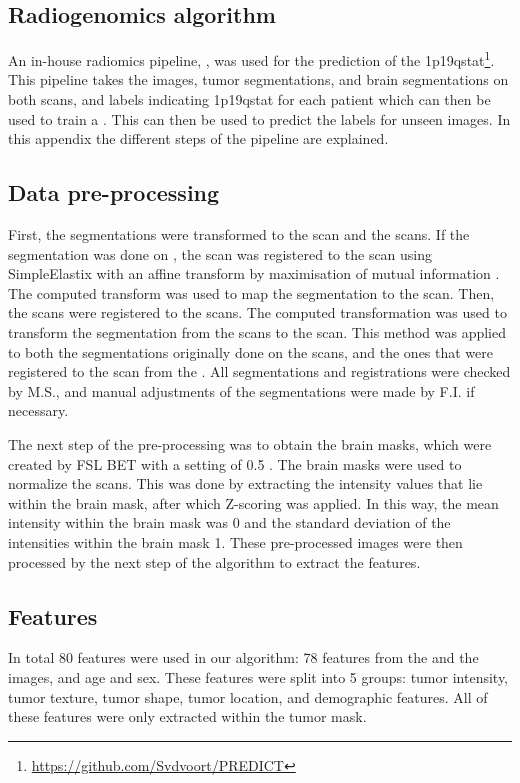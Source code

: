 \begin{subappendices}
\section{Radiogenomics algorithm}\label{app:LGG_1p19q_algorithm}
An in-house radiomics pipeline, , was used for the prediction of the \acl{1p19qstat}\footnote{\url{https://github.com/Svdvoort/PREDICT}}.
This pipeline takes the    images, \gls{tumor} segmentations, and brain segmentations on both scans, and labels indicating \acl{1p19qstat} for each patient which can then be used to train a  \autocite{cortes1995support}.
This  can then be used to predict the labels for unseen images. In this appendix the different steps of the pipeline are explained.

\subsection{Data pre-processing}
First, the segmentations were transformed to the  scan and the  scans.
If the segmentation was done on , the  scan was registered to the  scan using SimpleElastix with an affine transform by maximisation of mutual information \autocite{marstal2016simpleelastix}.
The computed transform was used to map the  segmentation to the  scan.
Then, the  scans were registered to the  scans.
The computed transformation was used to transform the segmentation from the  scans to the  scan.
This method was applied to both the segmentations originally done on the  scans, and the ones that were registered to the  scan from the .
All segmentations and registrations were checked by M.S., and manual adjustments of the segmentations were made by F.I. if necessary.

The next step of the pre-processing was to obtain the brain masks, which were created by FSL BET with a setting of 0.5 \autocite{smith2002fast}.
The brain masks were used to normalize the scans.
This was done by extracting the intensity values that lie within the brain mask, after which Z-scoring was applied.
In this way, the mean intensity within the brain mask was 0 and the standard deviation of the intensities within the brain mask 1.
These pre-processed images were then processed by the next step of the algorithm to extract the features.

\subsection{Features}
In total 80 features were used in our algorithm: 78 features from the  and the  images, and age and sex.
These features were split into 5 groups: \gls{tumor} intensity, \gls{tumor} texture, \gls{tumor} shape, \gls{tumor} location, and demographic features.
All of these features were only extracted within the \gls{tumor} mask.


\end{subappendices}

